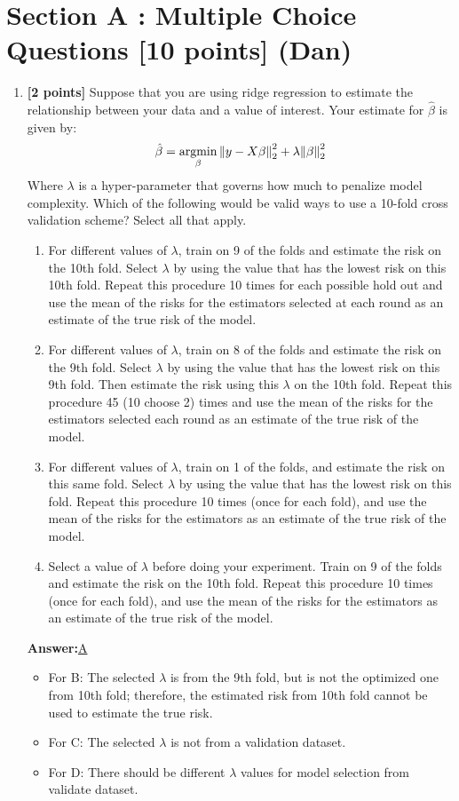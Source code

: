 
\section*{Section A : Multiple Choice Questions [10 points] (Dan)}

\begin{enumerate}
	\item {\textbf{[2 points]} Suppose that you are using ridge regression to estimate the relationship between your data and a value of interest. Your estimate for $\hat{\beta}$ is given by:
	$$\hat{\beta} = \operatorname*{\mathrm{argmin}}_\beta \norm{y - X \beta}_2^2 + \lambda \norm{\beta}_2^2$$
	Where $\lambda$ is a hyper-parameter that governs how much to penalize model complexity. Which of the following would be valid ways to use a 10-fold cross validation scheme? Select all that apply.
	}
	\begin{enumerate}[label=\Alph*)]
			\item {
				 For different values of $\lambda$, train on 9 of the folds and estimate the risk on the 10th fold. Select $\lambda$ by using the value that has the lowest risk on this 10th fold. Repeat this procedure 10 times for each possible hold out and use the mean of the risks for the estimators selected at each round as an estimate of the true risk of the model.
			}
			\item {
				 For different values of $\lambda$, train on 8 of the folds and estimate the risk on the 9th fold. Select $\lambda$ by using the value that has the lowest risk on this 9th fold. Then estimate the risk using this $\lambda$ on the 10th fold. Repeat this procedure 45 (10 choose 2) times and use the mean of the risks for the estimators selected each round as an estimate of the true risk of the model.
			}
			\item {
				 For different values of $\lambda$, train on 1 of the folds, and estimate the risk on this same fold. Select $\lambda$ by using the value that has the lowest risk on this fold. Repeat this procedure 10 times (once for each fold), and use the mean of the risks for the estimators as an estimate of the true risk of the model.
			}
			\item {
				 Select a value of $\lambda$ before doing your experiment. Train on 9 of the folds and estimate the risk on the 10th fold. Repeat this procedure 10 times (once for each fold), and use the mean of the risks for the estimators as an estimate of the true risk of the model.
			}
	\end{enumerate}
	\textbf{Answer:}\underline{A}\\
	\begin{itemize}
		\item For B: The selected $\lambda$ is from the 9th fold, but is not the optimized one from 10th fold; therefore, the estimated risk from 10th fold cannot be used to estimate the true risk.
		\item For C: The selected $\lambda$ is not from a validation dataset.
		\item For D: There should be different $\lambda$ values for model selection from validate dataset.
	\end{itemize}
	

\end{enumerate}
